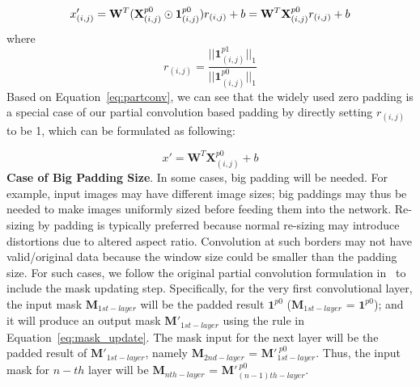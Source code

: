 \documentclass[10pt,twocolumn,letterpaper]{article}
\begin{document}
\begin{equation}
\label{eq:partconv}
    x'_{(i,j)} = \mathbf{W}^T(\mathbf{X}^{p0}_{(i,j)}\odot\mathbf{1}^{p0}_{(i,j)})r_{(i,j)} + b = \\ \mathbf{W}^T\mathbf{X}^{p0}_{(i,j)}r_{(i,j)} + b
\end{equation}
where
\begin{equation}
    r_{(i,j)} = \frac{||\mathbf{1}^{p1}_{(i,j)}||_1}{||\mathbf{1}^{p0}_{(i,j)}||_1}
\end{equation}%
Based on Equation~\ref{eq:partconv}, we can see that the widely used zero padding is a special case of our partial convolution based padding by directly setting $r_{(i,j)}$ to be 1, which can be formulated as following:

\begin{equation}
\label{eq:convzeropadding}
x'=\mathbf{W}^T\mathbf{X}^{p0}_{(i,j)}+b
\end{equation}\textbf{Case of Big Padding Size}. 
 In some cases, big padding will be needed. For example, input images may have different image sizes; big paddings may thus be needed to make images uniformly sized before feeding them into the network. Re-sizing by padding is typically preferred because normal re-sizing may introduce distortions due to altered aspect ratio. Convolution at such borders may not have valid/original data because the window size could be smaller than the padding size. 
For such cases, we follow the original partial convolution formulation in~\cite{liu2018image} to include the mask updating step. Specifically, for the very first convolutional layer, the input mask $\mathbf{M}_{1st-layer}$ will be the padded result $\mathbf{1}^{p0}$ ($\mathbf{M}_{1st-layer}$ = $\mathbf{1}^{p0}$); and it will produce an output mask $\mathbf{M}'_{1st-layer}$ using the rule in Equation~\ref{eq:mask_update}. The mask input for the next layer will be the padded result of $\mathbf{M}'_{1st-layer}$, namely $\mathbf{M}_{2nd-layer}$ = $\mathbf{M}'^{\ p0}_{1st-layer}$. Thus, the input mask for $n-th$ layer will be $\mathbf{M}_{nth-layer}$ = $\mathbf{M}'^{\ p0}_{(n-1)th-layer}$.
\end{document}
